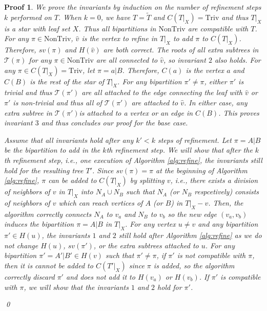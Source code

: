 \documentclass{bmcart}
\newcommand{\triv}{\mathrm{Triv}}
\newcommand{\ntriv}{\mathrm{NonTriv}}
\theoremstyle{mystyle}
\theoremstyle{proofstyle}
\newtheorem*{proof2}{Proof}
\newenvironment{proofnospace}{\begin{proof2}}{\qed \end{proof2}}
\begin{document}
\begin{proofnospace}
    We prove the invariants by induction on the number of refinement steps $k$ performed on $T$. When $k=0$, we have $T = \tilde{T}$ and $C(T|_X) = \triv$ and thus $T|_X$ is a star with leaf set $X$. Thus all bipartitions in $\ntriv$ are compatible with $T$. For any $\pi \in \ntriv $, $\hat{v}$ is the vertex to refine in $T|_X$ to add $\pi$ to $C(T|_X)$. Therefore, $sv(\pi)$ and $H(\hat{v})$ are both correct. The roots of all extra subtrees in $\mathcal{T}(\pi)$ for any $\pi \in \ntriv$ are all connected to $\hat{v}$, so invariant $2$ also holds. For any $\pi \in C(T|_X) = \triv$, let $\pi = {a}|B$. Therefore, $C({a})$ is the vertex $a$ and $C(B)$ is the rest of the star of $T|_X$. For any bipartition $\pi' \neq \pi$, either $\pi'$ is trivial and thus $\mathcal{T}(\pi')$ are all attached to the edge connecting the leaf with $\hat{v}$ or $\pi'$ is non-trivial and thus all of $\mathcal{T}(\pi')$ are attached to $\hat{v}$. In either case, any extra subtree in $\mathcal{T}(\pi')$is attached to a vertex or an edge in $C(B)$. This proves invariant $3$ and thus concludes our proof for the base case.\smallskip 
    
    Assume that all invariants hold after any $k' < k$ steps of refinement. Let $\pi = A|B$ be the bipartition to add in the $k$th refinement step. We will show that after the $k$th refinement step, i.e., one execution of Algorithm \ref{alg:refine}, the invariants still hold for the resulting tree $T'$. Since $sv(\pi) = \pi$ at the beginning of Algorithm \ref{alg:refine}, $\pi$ can be added to $C(T|_X)$ by splitting $v$, i.e., there exists a division of neighbors of $v$ in $T|_X$ into $N_A \cup N_B$ such that $N_A$ (or $N_B$ respcetively) consists of neighbors of $v$ which can reach vertices of $A$ (or $B$) in $T|_X-v$. Then, the algorithm correctly connects $N_A$ to $v_a$ and $N_B$ to $v_b$ so the new edge $(v_a,v_b)$ induces the bipartition $\pi = A|B$ in $T|_X$. For any vertex $u \neq v$ and any bipartition $\pi' \in H(u)$, the invariants $1$ and $2$ still hold after Algorithm \ref{alg:refine} as we do not change $H(u)$, $sv(\pi')$, or the extra subtrees attached to $u$. For any bipartition $\pi' = A'|B' \in H(v)$ such that $\pi' \neq \pi$, if $\pi'$ is not compatible with $\pi$, then it is cannot be added to $C(T'|_X)$ since $\pi$ is added, so the algorithm correctly discard $\pi'$ and does not add it to $H(v_a)$ or $H(v_b)$. If $\pi'$ is compatible with $\pi$, we will show that the invariants $1$ and $2$ hold for $\pi'$.\smallskip
    

\end{proofnospace}
\end{document}

